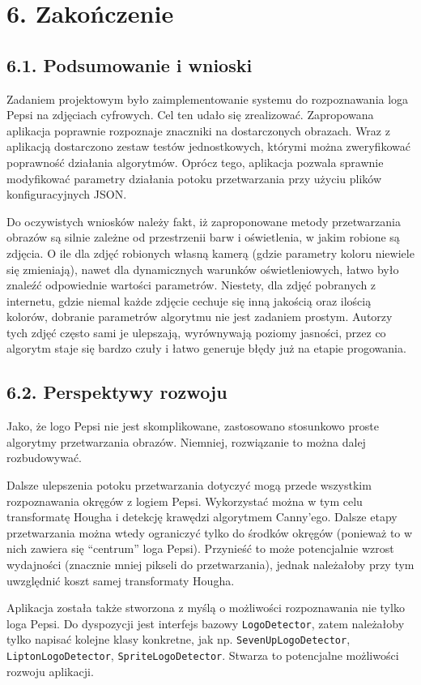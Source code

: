 \documentclass[11pt,a4paper,twoside]{report}
\begin{document}
\section*{6. Zakończenie}

	\subsection*{6.1. Podsumowanie i wnioski}

		Zadaniem projektowym było zaimplementowanie systemu do rozpoznawania loga Pepsi na zdjęciach cyfrowych. Cel ten udało się zrealizować. Zapropowana aplikacja poprawnie rozpoznaje znaczniki na dostarczonych obrazach. Wraz z aplikacją dostarczono zestaw testów jednostkowych, którymi można zweryfikować poprawność działania algorytmów. Oprócz tego, aplikacja pozwala sprawnie modyfikować parametry działania potoku przetwarzania przy użyciu plików konfiguracyjnych JSON.

		Do oczywistych wniosków należy fakt, iż zaproponowane metody przetwarzania obrazów są silnie zależne od przestrzenii barw i oświetlenia, w jakim robione są zdjęcia. O ile dla zdjęć robionych własną kamerą (gdzie parametry koloru niewiele się zmieniają), nawet dla dynamicznych warunków oświetleniowych, łatwo było znaleźć odpowiednie wartości parametrów. Niestety, dla zdjęć pobranych z internetu, gdzie niemal każde zdjęcie cechuje się inną jakością oraz ilością kolorów, dobranie parametrów algorytmu nie jest zadaniem prostym. Autorzy tych zdjęć często sami je ulepszają, wyrównywają poziomy jasności, przez co algorytm staje się bardzo czuły i łatwo generuje błędy już na etapie progowania.

	\subsection*{6.2. Perspektywy rozwoju}

		Jako, że logo Pepsi nie jest skomplikowane, zastosowano stosunkowo proste algorytmy przetwarzania obrazów. Niemniej, rozwiązanie to można dalej rozbudowywać.

		Dalsze ulepszenia potoku przetwarzania dotyczyć mogą przede wszystkim rozpoznawania okręgów z logiem Pepsi. Wykorzystać można w tym celu transformatę Hougha i detekcję krawędzi algorytmem Canny'ego. Dalsze etapy przetwarzania można wtedy ograniczyć tylko do środków okręgów (ponieważ to w nich zawiera się ``centrum'' loga Pepsi). Przynieść to może potencjalnie wzrost wydajności (znacznie mniej pikseli do przetwarzania), jednak należałoby przy tym uwzględnić koszt samej transformaty Hougha.

		Aplikacja została także stworzona z myślą o możliwości rozpoznawania nie tylko loga Pepsi. Do dyspozycji jest interfejs bazowy \texttt{LogoDetector}, zatem należałoby tylko napisać kolejne klasy konkretne, jak np. \texttt{SevenUpLogoDetector}, \texttt{LiptonLogoDetector}, \texttt{SpriteLogoDetector}. Stwarza to potencjalne możliwości rozwoju aplikacji.
\end{document}

